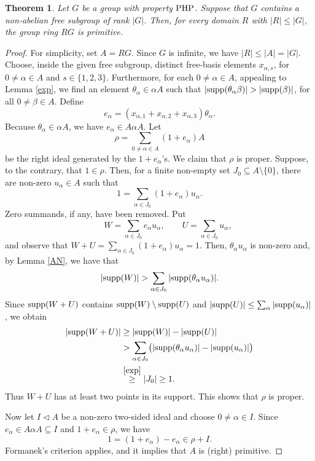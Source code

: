 \documentclass[11pt]{article}
\newtheorem{thm}{Theorem}[section]
\theoremstyle{definition}
\theoremstyle{remark}
\numberwithin{equation}{section}
\numberwithin{equation}{section}
\numberwithin{equation}{section}
\begin{document}
\begin{thm}\label{domain}
Let $G$ be a group with property ${\rm {PHP}}$. Suppose that $G$ contains a non-abelian free subgroup of rank $|G|$.  Then, for every domain $R$ with $|R|\leq|G|$, the group ring $R G$ is primitive.
\end{thm}

\begin{proof}
For simplicity, set $A=R G$. Since $G$ is infinite, we have $|R|\leq|A|=|G|$. Choose, inside the given free subgroup, distinct free-basis elements $x_{\alpha,s}$, for $0\neq\alpha\in A$ and $s\in\{1,2,3\}$. Furthermore, for each $0\neq\alpha\in A$, appealing to Lemma \ref{exp}, we find an element $\theta_\alpha\in\alpha A$ such that $|{\rm supp}(\theta_\alpha\beta)|>|{\rm supp}(\beta)|$, for all $0\neq\beta\in A$. Define
$$
 e_\alpha=(x_{\alpha,1}+x_{\alpha,2}+x_{\alpha,3})
             \theta_\alpha.
$$
Because $\theta_\alpha\in\alpha A$, we have $e_\alpha\in A\alpha A$.  Let
$$
 \rho=\sum_{0\neq\alpha\in A}(1+e_\alpha)A
$$
be the right ideal generated by the $1+e_\alpha$'s. We claim that $\rho$ is proper.  Suppose, to the contrary, that $1\in\rho$. Then, for a finite non-empty set $J_0\subseteq A\setminus\{0\}$, there are non-zero $u_\alpha\in A$ such
that
$$
 1=\sum_{\alpha\in J_0}(1+e_\alpha)u_\alpha.
$$
Zero summands, if any, have been removed.  Put
$$
 \qquad W=\sum_{\alpha\in J_0}e_\alpha u_\alpha, \qquad U=\sum_{\alpha\in J_0}u_\alpha,
$$
and observe that $W+U=\sum_{\alpha\in J_0}(1+e_\alpha)u_\alpha=1$. Then, $\theta_\alpha u_\alpha$ is non-zero and, by Lemma \ref{AN}, we have that 
$$
 |{\rm supp}(W)|>\sum_{\alpha\in J_0}|{\rm supp}(\theta_\alpha u_\alpha)|.
$$
Since ${\rm supp}(W+U)$ contains
${\rm supp}(W)\setminus{\rm supp}(U)$ and
$|{\rm supp}(U)|\leq\sum_\alpha|{\rm supp}(u_\alpha)|$, we obtain
\begin{align*}
 |{\rm supp}(W+U)|
 &\geq |{\rm supp}(W)|-|{\rm supp}(U)|\\
 &>\sum_{\alpha\in J_0}
   \bigl(|{\rm supp}(\theta_\alpha u_\alpha)|-|{\rm supp}(u_\alpha)|\bigr)\\
 &\overset{\ref{exp}}{\geq} |J_0|\geq1.
\end{align*}
Thus $W+U$ has at least two points in its support. This shows that $\rho$ is proper.

Now let $I\triangleleft A$ be a non-zero two-sided ideal and choose $0\neq\alpha\in I$.  Since $e_\alpha\in A\alpha A\subseteq I$ and $1+e_\alpha\in\rho$, we have
$$
 1=(1+e_\alpha)-e_\alpha\in\rho+I.
$$
Formanek's criterion applies, and it implies that $A$ is (right) primitive.
\end{proof}
\end{document}
